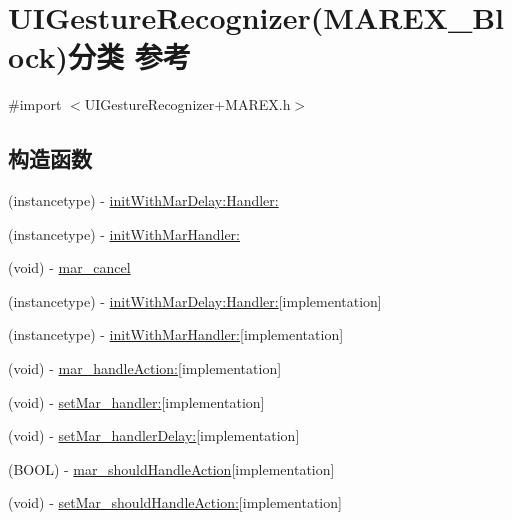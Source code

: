 \hypertarget{category_u_i_gesture_recognizer_07_m_a_r_e_x___block_08}{}\section{U\+I\+Gesture\+Recognizer(M\+A\+R\+E\+X\+\_\+\+Block)分类 参考}
\label{category_u_i_gesture_recognizer_07_m_a_r_e_x___block_08}


{\ttfamily \#import $<$U\+I\+Gesture\+Recognizer+\+M\+A\+R\+E\+X.\+h$>$}

\subsection*{构造函数}
\begin{DoxyCompactItemize}
\item 
(instancetype) -\/ \hyperlink{category_u_i_gesture_recognizer_07_m_a_r_e_x___block_08_a866bf845d0435b637c6811f4688921ba}{init\+With\+Mar\+Delay\+:\+Handler\+:}
\item 
(instancetype) -\/ \hyperlink{category_u_i_gesture_recognizer_07_m_a_r_e_x___block_08_a229beb62690f366a1f988ea1b3d5db69}{init\+With\+Mar\+Handler\+:}
\item 
(void) -\/ \hyperlink{category_u_i_gesture_recognizer_07_m_a_r_e_x___block_08_ac83e4894ae42430e6e0ceefd22afa03d}{mar\+\_\+cancel}
\item 
(instancetype) -\/ \hyperlink{category_u_i_gesture_recognizer_07_m_a_r_e_x___block_08_a369298526d18f78c0546a74da1d59037}{init\+With\+Mar\+Delay\+:\+Handler\+:}{\ttfamily  \mbox{[}implementation\mbox{]}}
\item 
(instancetype) -\/ \hyperlink{category_u_i_gesture_recognizer_07_m_a_r_e_x___block_08_a5e1252f56de963a59c31c8f8f44d559f}{init\+With\+Mar\+Handler\+:}{\ttfamily  \mbox{[}implementation\mbox{]}}
\item 
(void) -\/ \hyperlink{category_u_i_gesture_recognizer_07_m_a_r_e_x___block_08_a0b2b9fe2666c4e42cfc2ae11e7ce2221}{mar\+\_\+handle\+Action\+:}{\ttfamily  \mbox{[}implementation\mbox{]}}
\item 
(void) -\/ \hyperlink{category_u_i_gesture_recognizer_07_m_a_r_e_x___block_08_adad0e6bd0b537a15a31d6f73e68bc4ab}{set\+Mar\+\_\+handler\+:}{\ttfamily  \mbox{[}implementation\mbox{]}}
\item 
(void) -\/ \hyperlink{category_u_i_gesture_recognizer_07_m_a_r_e_x___block_08_af5074604b160098be838254965b06db9}{set\+Mar\+\_\+handler\+Delay\+:}{\ttfamily  \mbox{[}implementation\mbox{]}}
\item 
(B\+O\+OL) -\/ \hyperlink{category_u_i_gesture_recognizer_07_m_a_r_e_x___block_08_a254ee924408c263884df11c877413f6e}{mar\+\_\+should\+Handle\+Action}{\ttfamily  \mbox{[}implementation\mbox{]}}
\item 
(void) -\/ \hyperlink{category_u_i_gesture_recognizer_07_m_a_r_e_x___block_08_ae68020b81d20ff90f87df047ed47bc91}{set\+Mar\+\_\+should\+Handle\+Action\+:}{\ttfamily  \mbox{[}implementation\mbox{]}}
\end{DoxyCompactItemize}
